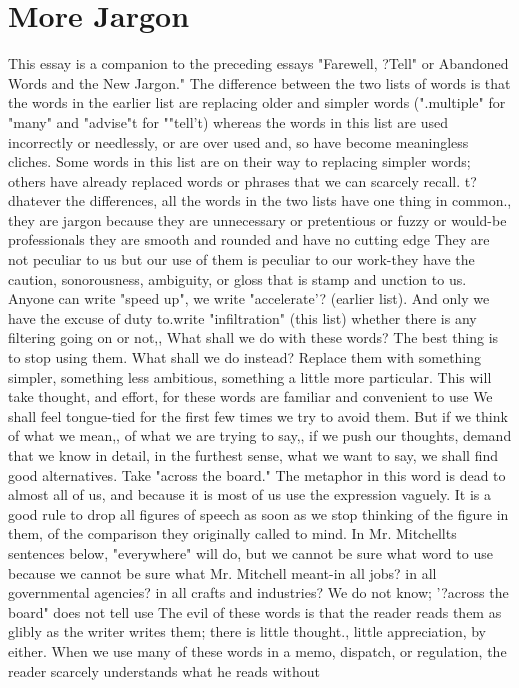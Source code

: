 \documentclass[
    oneside,
    11pt,
    draft
]{memoir}
\begin{document}
\chapter{More Jargon}
This essay is a companion to the preceding essays "Farewell, ?Tell" or Abandoned Words and the New Jargon." The difference between the two lists of words is that the words in the earlier list are replacing older and simpler words (".multiple" for "many" and "advise"t for ""tell't) whereas the words in this list are used incorrectly or needlessly, or are over used and, so have become meaningless cliches. Some words in this list are on their way to replacing simpler words; others have already replaced words or phrases that we can scarcely recall. t?dhatever the differences, all the words in the two lists have one thing in common., they are jargon because they are unnecessary or pretentious or fuzzy or would-be professionals they are smooth and rounded and have no cutting edge They are not peculiar to us but our use of them is peculiar to our work-they have the caution, sonorousness, ambiguity, or gloss that is stamp and unction to us. Anyone can write "speed up", we write "accelerate'? (earlier list). And only we have the excuse of duty to.write "infiltration" (this list) whether there is any filtering going on or not,, What shall we do with these words? The best thing is to stop using them. What shall we do instead? Replace them with something simpler, something less ambitious, something a little more particular. This will take thought, and effort, for these words are familiar and convenient to use We shall feel tongue-tied for the first few times we try to avoid them. But if we think of what we mean,, of what we are trying to say,, if we push our thoughts, demand that we know in detail, in the furthest sense, what we want to say, we shall find good alternatives. Take "across the board." The metaphor in this word is dead to almost all of us, and because it is most of us use the expression vaguely. It is a good rule to drop all figures of speech as soon as we stop thinking of the figure in them, of the comparison they originally called to mind. In Mr. Mitchellts sentences below, "everywhere" will do, but we cannot be sure what word to use because we cannot be sure what Mr. Mitchell meant-in all jobs? in all governmental agencies? in all crafts and industries? We do not know; '?across the board" does not tell use The evil of these words is that the reader reads them as glibly as the writer writes them; there is little thought., little appreciation, by either. When we use many of these words in a memo, dispatch, or regulation, the reader scarcely understands what he reads without
\end{document}
